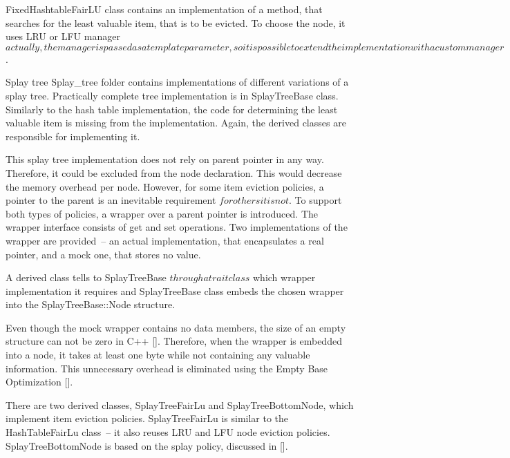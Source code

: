 FixedHashtableFairLU class contains an implementation of a method, that searches for the least valuable item, that is to be evicted. To choose the node, it uses LRU or LFU manager \(actually, the manager is passed as a template parameter, so it is possible to extend the implementation with a custom manager\).

Splay tree
Splay\_tree folder contains implementations of different variations of a splay tree. Practically complete tree implementation is in SplayTreeBase class. Similarly to the hash table implementation, the code for determining the least valuable item is missing from the implementation. Again, the derived classes are responsible for implementing it.

This splay tree implementation does not rely on parent pointer in any way. Therefore, it could be excluded from the node declaration. This would decrease the memory overhead per node. However, for some item eviction policies, a pointer to the parent is an inevitable requirement \(for others it is not\). To support both types of policies, a wrapper over a parent pointer is introduced. The wrapper interface consists of get and set operations. Two implementations of the wrapper are provided~-- an actual implementation, that encapsulates a real pointer, and a mock one, that stores no value.

A derived class tells to SplayTreeBase \(through a trait class\) which wrapper implementation it requires and SplayTreeBase class embeds the chosen wrapper into the SplayTreeBase::Node structure.

Even though the mock wrapper contains no data members, the size of an empty structure can not be zero in C++ []. Therefore, when the wrapper is embedded into a node, it takes at least one byte while not containing any valuable information. This unnecessary overhead is eliminated using the Empty Base Optimization [].

There are two derived classes, SplayTreeFairLu and SplayTreeBottomNode, which implement item eviction policies. SplayTreeFairLu is similar to the HashTableFairLu class~-- it also reuses LRU and LFU node eviction policies. SplayTreeBottomNode is based on the splay policy, discussed in [].
